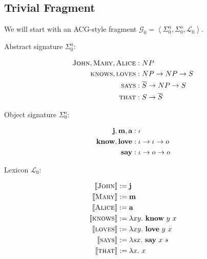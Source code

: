 \subsection{Trivial Fragment}

We will start with an ACG-style fragment $\mathcal{G}_0 = \left<
\Sigma^a_0, \Sigma^o_0, \mathcal{L}_0 \right>$.

Abstract signature $\Sigma^a_0$:

\begin{align*}
  \textsc{John}, \textsc{Mary}, \textsc{Alice} &: NP \\
  \textsc{knows}, \textsc{loves} &: NP \to NP \to S \\
  \textsc{says} &: \overline{S} \to NP \to S \\
  \textsc{that} &: S \to \overline{S} \\
\end{align*}

Object signature $\Sigma^o_0$:

\begin{align*}
  \textbf{j}, \textbf{m}, \textbf{a} &: \iota \\
  \textbf{know}, \textbf{love} &: \iota \to \iota \to o \\
  \textbf{say} &: \iota \to o \to o
\end{align*}

Lexicon $\mathcal{L}_0$:

\begin{align*}
  \llbracket \textsc{John} \rrbracket &:= \textbf{j} \\
  \llbracket \textsc{Mary} \rrbracket &:= \textbf{m} \\
  \llbracket \textsc{Alice} \rrbracket &:= \textbf{a} \\
  \llbracket \textsc{knows} \rrbracket &:= \lambda x y.\ \textbf{know}\ y\ x \\
  \llbracket \textsc{loves} \rrbracket &:= \lambda x y.\ \textbf{love}\ y\ x \\
  \llbracket \textsc{says} \rrbracket &:= \lambda s x.\ \textbf{say}\ x\ s \\
  \llbracket \textsc{that} \rrbracket &:= \lambda x.\ x
\end{align*}
